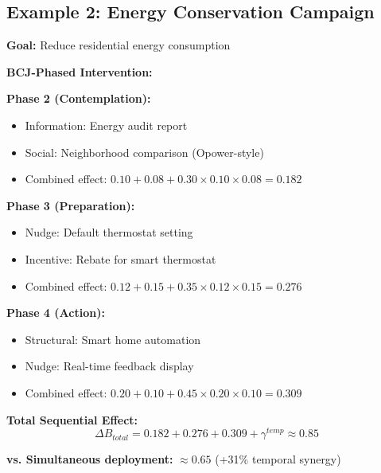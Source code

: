 \subsection{Example 2: Energy Conservation Campaign}

\begin{tcolorbox}[colback=gray!5!white,colframe=gray!75!black,title=\textbf{Case: Household Energy Reduction}]

\textbf{Goal:} Reduce residential energy consumption

\textbf{BCJ-Phased Intervention:}

\textbf{Phase 2 (Contemplation):}
\begin{itemize}[noitemsep]
    \item Information: Energy audit report
    \item Social: Neighborhood comparison (Opower-style)
    \item Combined effect: $0.10 + 0.08 + 0.30 \times 0.10 \times 0.08 = 0.182$
\end{itemize}

\textbf{Phase 3 (Preparation):}
\begin{itemize}[noitemsep]
    \item Nudge: Default thermostat setting
    \item Incentive: Rebate for smart thermostat
    \item Combined effect: $0.12 + 0.15 + 0.35 \times 0.12 \times 0.15 = 0.276$
\end{itemize}

\textbf{Phase 4 (Action):}
\begin{itemize}[noitemsep]
    \item Structural: Smart home automation
    \item Nudge: Real-time feedback display
    \item Combined effect: $0.20 + 0.10 + 0.45 \times 0.20 \times 0.10 = 0.309$
\end{itemize}

\textbf{Total Sequential Effect:}
\begin{equation}
\Delta B_{total} = 0.182 + 0.276 + 0.309 + \gamma^{temp} \approx 0.85
\end{equation}

\textbf{vs. Simultaneous deployment:} $\approx 0.65$ (+31\% temporal synergy)
\end{tcolorbox}

